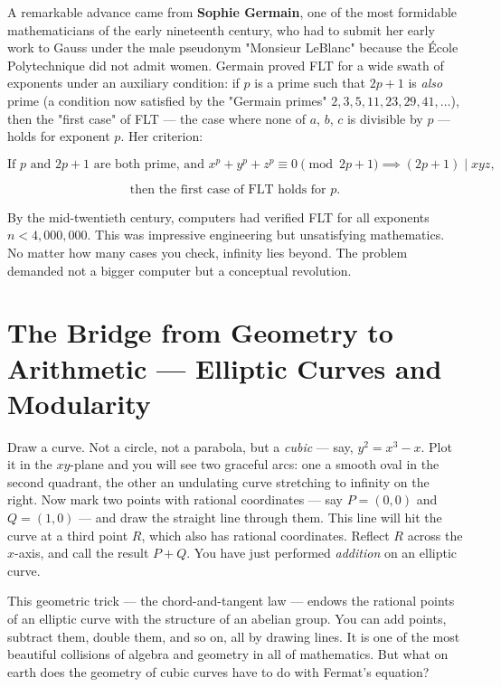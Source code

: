 \documentclass[11pt,twoside,openright]{book}
\theoremstyle{definition}
\theoremstyle{remark}
\begin{document}
A remarkable advance came from \textbf{Sophie Germain}, one of the most formidable mathematicians of the early nineteenth century, who had to submit her early work to Gauss under the male pseudonym "Monsieur LeBlanc" because the \'Ecole Polytechnique did not admit women. Germain proved FLT for a wide swath of exponents under an auxiliary condition: if $p$ is a prime such that $2p + 1$ is \textit{also} prime (a condition now satisfied by the "Germain primes" $2, 3, 5, 11, 23, 29, 41, \ldots$), then the "first case" of FLT --- the case where none of $a$, $b$, $c$ is divisible by $p$ --- holds for exponent $p$. Her criterion:

\[\text{If } p \text{ and } 2p+1 \text{ are both prime, and } x^p + y^p + z^p \equiv 0 \pmod{2p+1} \implies (2p+1) \mid xyz,\]

\[\text{then the first case of FLT holds for } p.\]


By the mid-twentieth century, computers had verified FLT for all exponents $n < 4{,}000{,}000$. This was impressive engineering but unsatisfying mathematics. No matter how many cases you check, infinity lies beyond. The problem demanded not a bigger computer but a conceptual revolution.


\section{The Bridge from Geometry to Arithmetic --- Elliptic Curves and Modularity}

Draw a curve. Not a circle, not a parabola, but a \textit{cubic} --- say, $y^2 = x^3 - x$. Plot it in the $xy$-plane and you will see two graceful arcs: one a smooth oval in the second quadrant, the other an undulating curve stretching to infinity on the right. Now mark two points with rational coordinates --- say $P = (0, 0)$ and $Q = (1, 0)$ --- and draw the straight line through them. This line will hit the curve at a third point $R$, which also has rational coordinates. Reflect $R$ across the $x$-axis, and call the result $P + Q$. You have just performed \textit{addition} on an elliptic curve.


This geometric trick --- the chord-and-tangent law --- endows the rational points of an elliptic curve with the structure of an abelian group. You can add points, subtract them, double them, and so on, all by drawing lines. It is one of the most beautiful collisions of algebra and geometry in all of mathematics. But what on earth does the geometry of cubic curves have to do with Fermat's equation?
\end{document}

